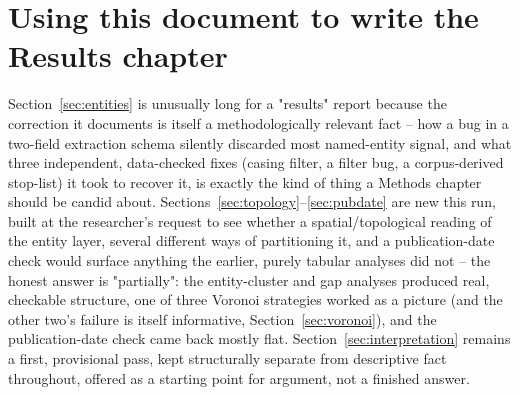 \documentclass[11pt,a4paper]{article}
\begin{document}
\section{Using this document to write the Results chapter}

Section~\ref{sec:entities} is unusually long for a "results" report
because the correction it documents is itself a methodologically
relevant fact -- how a bug in a two-field extraction schema silently
discarded most named-entity signal, and what three independent,
data-checked fixes (casing filter, a filter bug, a corpus-derived
stop-list) it took to recover it, is exactly the kind of thing a
Methods chapter should be candid about. Sections~\ref{sec:topology}--\ref{sec:pubdate}
are new this run, built at the researcher's request to see whether a
spatial/topological reading of the entity layer, several different
ways of partitioning it, and a publication-date check would surface
anything the earlier, purely tabular analyses did not -- the honest
answer is "partially": the entity-cluster and gap analyses produced
real, checkable structure, one of three Voronoi strategies worked as a
picture (and the other two's failure is itself informative,
Section~\ref{sec:voronoi}), and the publication-date check came back
mostly flat. Section~\ref{sec:interpretation} remains a first,
provisional pass, kept structurally separate from descriptive fact
throughout, offered as a starting point for argument, not a finished
answer.
\end{document}
